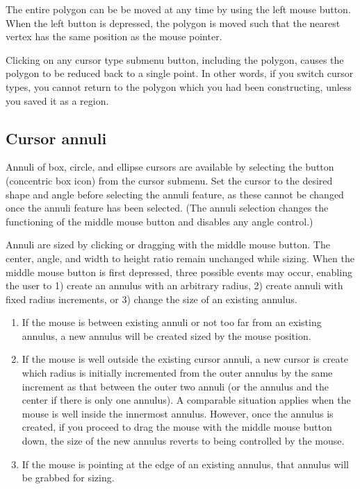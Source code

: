 The entire polygon can be be moved at any time by using the left mouse
button.  When the left button is depressed, the polygon is moved such that
the nearest vertex has the same position as the mouse pointer.

Clicking on any cursor type submenu button, including the polygon, causes
the polygon to be reduced back to a single point.  In other words, if you
switch cursor types, you cannot return to the polygon which you had been
constructing, unless you saved it as a region.

\subsection{ Cursor annuli }

Annuli of box, circle, and ellipse cursors are available by selecting the
 button (concentric box icon) from the cursor submenu.  Set the cursor to the desired shape
and angle before selecting the annuli feature, as these cannot be changed
once the annuli feature has been selected.  (The annuli selection changes
the functioning of the middle mouse button and disables any angle control.)

Annuli are sized by clicking or dragging with the middle mouse button.
The center, angle, and width to height ratio remain unchanged while sizing.
When the middle mouse button is first depressed, three possible events may
occur, enabling the user to 1) create an annulus with an arbitrary radius,
2) create annuli with fixed radius increments, or 3) change the size of an
existing annulus.
\begin{enumerate}
\item If the mouse is between existing annuli or not too far from an
     existing annulus, a new annulus will be created sized by the mouse
     position.
\item If the mouse is well outside the existing cursor annuli, a new cursor
     is create which radius is initially incremented from the outer annulus
     by the same increment as that between the outer two annuli (or the
     annulus and the center if there is only one annulus).  A comparable
     situation applies when the mouse is well inside the innermost annulus.
     However, once the annulus is created, if you proceed to drag the mouse
     with the middle mouse button down, the size of the new annulus reverts
     to being controlled by the mouse.
\item If the mouse is pointing at the edge of an existing annulus, that
     annulus will be grabbed for sizing.
\end{enumerate}


